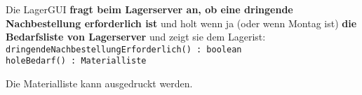 Die LagerGUI \textbf{fragt beim Lagerserver an, ob eine dringende Nachbestellung erforderlich ist} und holt wenn ja (oder wenn Montag ist) \textbf{die Bedarfsliste von Lagerserver} und zeigt sie dem Lagerist:\\
\medskip
\texttt{dringendeNachbestellungErforderlich() : boolean} \\
\medskip
\texttt{holeBedarf() : Materialliste}\\
\medskip

Die Materialliste kann ausgedruckt werden.